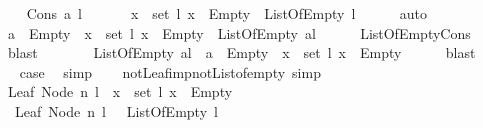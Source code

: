 \begin{isabellebody}
\isamarkupfalse%
\isanewline
\ \ \isamarkupfalse%
\ {\isacharparenleft}Cons\ a\ l{\isacharparenright}\isanewline
\ \ \isamarkupfalse%
\ \isamarkupfalse%
\ \ {\isachardoublequoteopen}{\isacharparenleft}{\isasymforall}x\ {\isasymin}\ set\ l{\isachardot}\ x\ {\isacharequal}\ Empty{\isacharparenright}\ {\isasymlongrightarrow}\ ListOfEmpty\ l{\isachardoublequoteclose}\isanewline
\ \ \ \ \isamarkupfalse%
\ auto\isanewline
\ \ \isamarkupfalse%
\ \isamarkupfalse%
\ {\isachardoublequoteopen}a\ {\isacharequal}\ Empty\ {\isasymand}\ {\isacharparenleft}{\isasymforall}x\ {\isasymin}\ set\ l{\isachardot}\ x\ {\isacharequal}\ Empty{\isacharparenright}\ {\isasymlongrightarrow}\ ListOfEmpty\ {\isacharparenleft}a{\isacharhash}l{\isacharparenright}{\isachardoublequoteclose}\isanewline
\ \ \ \ \isamarkupfalse%
\ ListOfEmpty{\isachardot}Cons\ \isamarkupfalse%
\ blast\ \isanewline
\ \ \isamarkupfalse%
\ \isamarkupfalse%
\ {\isachardoublequoteopen}{\isasymnot}\ ListOfEmpty\ {\isacharparenleft}a{\isacharhash}l{\isacharparenright}\ {\isasymlongrightarrow}\ {\isacharparenleft}a\ {\isasymnoteq}\ Empty\ {\isasymor}\ {\isacharparenleft}{\isasymexists}x\ {\isasymin}\ set\ l{\isachardot}\ x\ {\isasymnoteq}\ Empty{\isacharparenright}{\isacharparenright}{\isachardoublequoteclose}\isanewline
\ \ \ \ \isamarkupfalse%
\ blast\isanewline
\ \ \isamarkupfalse%
\ \isamarkupfalse%
\ {\isacharquery}case\ \isamarkupfalse%
\ simp\isanewline
{}\isamarkupfalse%
%
\endisatagproof
{\isafoldproof}%
%
\isadelimproof
\isanewline
%
\endisadelimproof
\ \ \isanewline
{}\isamarkupfalse%
\ not{\isacharunderscore}Leaf{\isacharunderscore}imp{\isacharunderscore}not{\isacharunderscore}List{\isacharunderscore}of{\isacharunderscore}empty\ {\isacharbrackleft}simp{\isacharbrackright}{\isacharcolon}\ \isanewline
{\isachardoublequoteopen}{\isasymnot}\ Leaf\ {\isacharparenleft}Node\ n\ l{\isacharparenright}\ {\isasymlongrightarrow}\ {\isacharparenleft}{\isasymexists}x\ {\isasymin}\ set\ l{\isachardot}\ x\ {\isasymnoteq}\ Empty{\isacharparenright}{\isachardoublequoteclose}\ \ \ \ \isanewline
%
\isadelimproof
%
\endisadelimproof
%
\isatagproof
{}\isamarkupfalse%
\ {\isacharminus}\isanewline
\ \ \isamarkupfalse%
\ {\isachardoublequoteopen}{\isasymnot}\ Leaf\ {\isacharparenleft}Node\ n\ l{\isacharparenright}\ {\isasymlongrightarrow}\ {\isasymnot}\ ListOfEmpty\ l{\isachardoublequoteclose}\isanewline

\end{isabellebody}
